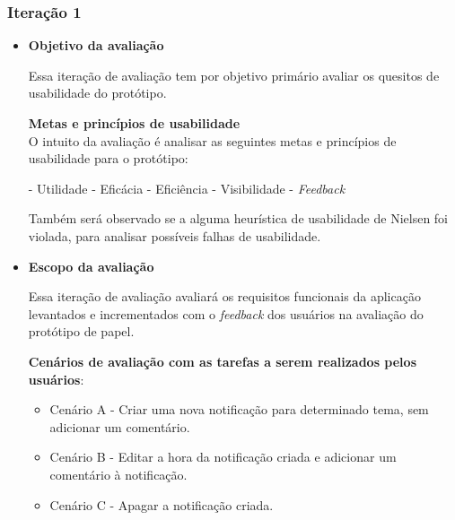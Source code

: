	\subsubsection{Iteração 1}
	
	  \begin{itemize}
	   \item \textbf{Objetivo da avaliação}
	      
	      \subitem Essa iteração de avaliação tem por objetivo primário avaliar os quesitos de usabilidade do protótipo.
	      
	      \subitem \textbf{Metas e princípios de usabilidade}\\
		O intuito da avaliação é analisar as seguintes metas e princípios de usabilidade para o protótipo:
		
		\subsubitem - Utilidade
		\subsubitem - Eficácia
		\subsubitem - Eficiência
		\subsubitem - Visibilidade
		\subsubitem - \textit{Feedback}
		
	      Também será observado se a alguma heurística de usabilidade de Nielsen foi violada, para analisar possíveis 
	      falhas de usabilidade.
	    
	   \item \textbf{Escopo da avaliação}
	      
	      \subitem Essa iteração de avaliação avaliará os requisitos funcionais da aplicação levantados e incrementados
	       com o \textit{feedback} dos usuários na avaliação do protótipo de papel.
	      
	      \subitem \textbf{Cenários de avaliação com as tarefas a serem realizados pelos usuários}:
		
		\begin{itemize}
		  \item Cenário A - Criar uma nova notificação para determinado tema, sem adicionar um comentário.
		    
		    
		  \item Cenário B - Editar a hora da notificação criada e adicionar um comentário à notificação.
		    
		    
		  \item Cenário C - Apagar a notificação criada.
		    
		  

\end{itemize}
\end{itemize}
